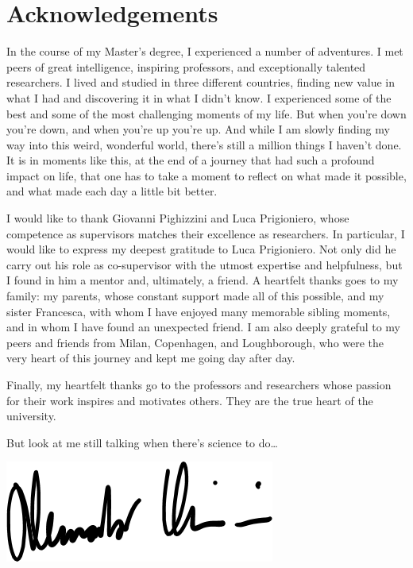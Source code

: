 \chapter*{Acknowledgements}
In the course of my Master's degree, I experienced a number of adventures.
I met peers of great intelligence, inspiring professors, and exceptionally talented researchers.
I lived and studied in three different countries, finding new value in what I had and discovering it in what I didn't know.
I experienced some of the best and some of the most challenging moments of my life.
But when you're down you're down, and when you're up you're up.
And while I am slowly finding my way into this weird, wonderful world, there's still a million things I haven't done.
It is in moments like this, at the end of a journey that had such a profound impact on life, that one has to take a moment to reflect on what made it possible, and what made each day a little bit better.

I would like to thank Giovanni Pighizzini and Luca Prigioniero, whose competence as supervisors matches their excellence as researchers.
In particular, I would like to express my deepest gratitude to Luca Prigioniero.
Not only did he carry out his role as co-supervisor with the utmost expertise and helpfulness, but I found in him a mentor and, ultimately, a friend.
A heartfelt thanks goes to my family: my parents, whose constant support made all of this possible, and my sister Francesca, with whom I have enjoyed many memorable sibling moments, and in whom I have found an unexpected friend.
I am also deeply grateful to my peers and friends from Milan, Copenhagen, and Loughborough, who were the very heart of this journey and kept me going day after day.

Finally, my heartfelt thanks go to the professors and researchers whose passion for their work inspires and motivates others.
They are the true heart of the university.

\vskip 5mm

\noindent But look at me still talking when there's science to do\dots

\vskip 5mm

\hfill\includegraphics[scale=1.3]{img/signature.png}\hspace{3mm}\raisebox{3.5ex}{\tikz\Aleduck[scale=.35];}
